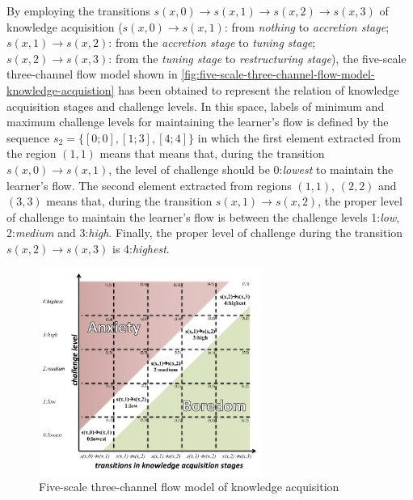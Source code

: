 By employing the transitions $s(x,0) \to s(x,1) \to s(x,2) \to s(x,3)$ of knowledge acquisition ($s(x,0) \to s(x,1)$: from \emph{nothing} to \emph{accretion stage}; $s(x,1) \to s(x,2)$: from the \emph{accretion stage} to \emph{tuning stage}; $s(x,2) \to s(x,3)$: from the \emph{tuning stage} to \emph{restructuring stage}), the five-scale three-channel flow model shown in \autoref{fig:five-scale-three-channel-flow-model-knowledge-acquistion} has been obtained to represent the relation of knowledge acquisition stages and challenge levels.
In this space, labels of minimum and maximum challenge levels for maintaining the learner’s flow is defined by the sequence $s_{2} = \{[0;0], [1;3], [4;4]\}$ in which the first element \aspas{$[0;0]$} extracted from the region $(1,1)$ means that means that, during the transition $s(x,0) \to s(x,1)$, the level of challenge should be 0:\emph{lowest} to maintain the learner’s flow.
The second element \aspas{$[1;3]$} extracted from regions $(1,1)$, $(2,2)$ and $(3,3)$ means that, during the transition $s(x,1) \to s(x,2)$, the proper level of challenge to maintain the learner’s flow is between the challenge levels 1:\emph{low}, 2:\emph{medium} and 3:\emph{high}.
Finally, the proper level of challenge during the transition $s(x,2) \to s(x,3)$ is 4:\emph{highest}.

 \begin{figure}[htb]
 \caption{Five-scale three-channel flow model of knowledge acquisition}
 \label{fig:five-scale-three-channel-flow-model-knowledge-acquistion}
 \centering
 \includegraphics[width=0.65\textwidth]{images/chap-model-gmif/five-scale-three-channel-flow-model-knowledge-acquistion.png}
 \fautor
\end{figure}

